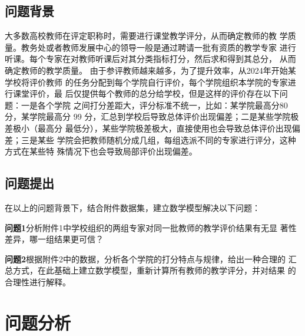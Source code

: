 \documentclass[withoutpreface,bwprint]{cumcmthesis}
\begin{document}
\subsection{问题背景}
大多数高校教师在评定职称时，需要进行课堂教学评分，从而确定教师的教
学质量。教务处或者教师发展中心的领导一般是通过聘请一批有资质的教学专家
进行听课。每个专家在对教师听课后对其分类指标打分，然后求和得到其总分，
从而确定教师的教学质量。
由于参评教师越来越多，为了提升效率，从2024年开始某学校将评价教师
的任务分配到每个学院自行评价，每个学院组织本学院的专家进行课堂评价，最
后仅提供每个教师的总分给学校，但是这样的评价存在以下问题：一是各个学院
之间打分差距大，评分标准不统一，比如：某学院最高分80分，某学院最高分
99 分，汇总到学校后导致总体评价出现偏差；二是某些学院极差极小（最高分
最低分），某些学院极差极大，直接使用也会导致总体评价出现偏差；三是某些
学院会把教师随机分成几组，每组选派不同的专家进行评分，这种方式在某些特
殊情况下也会导致局部评价出现偏差。


\subsection{问题提出}

在以上的问题背景下，结合附件数据集，建立数学模型解决以下问题：

\textbf{问题1}分析附件1中学校组织的两组专家对同一批教师的教学评价结果有无显
著性差异，哪一组结果更可信？

\textbf{问题2}根据附件2中的数据，分析各个学院的打分特点与规律，给出一种合理的
汇总方式，在此基础上建立数学模型，重新计算所有教师的教学评分，并对结果
的合理性进行解释。


\section{问题分析}
\end{document}
